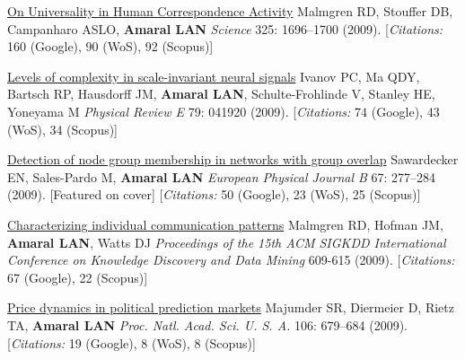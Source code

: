 \NumberedItem{\makebox[0.8cm][r]{[85]}}
\href{/people/amaral/universality-human-correspondence-activity}
{On Universality in Human Correspondence Activity}
\newline
Malmgren RD, Stouffer DB, Campanharo ASLO, {\textbf{Amaral LAN}}
\newline
\textit{Science}
    325:
1696--1700 (2009).
    [{\em{Citations:}} 160 (Google), 90 (WoS), 92 (Scopus)]
\newline
\Gap
~
\Gap

\NumberedItem{\makebox[0.8cm][r]{[84]}}
\href{/people/amaral/levels-of-complexity-in-scale-invariant-neural-signals}
{Levels of complexity in scale-invariant neural signals}
\newline
Ivanov PC, Ma QDY, Bartsch RP, Hausdorff JM, {\textbf{Amaral LAN}}, Schulte-Frohlinde V, Stanley HE, Yoneyama M
\newline
\textit{Physical Review E}
    79:
041920 (2009).
    [{\em{Citations:}} 74 (Google), 43 (WoS), 34 (Scopus)]
\newline
\Gap
~
\Gap

\NumberedItem{\makebox[0.8cm][r]{[83]}}
\href{/people/amaral/detection-of-node-group-membership-in-networks-with-group-overlap}
{Detection of node group membership in networks with group overlap}
\newline
Sawardecker EN, Sales-Pardo M, {\textbf{Amaral LAN}}
\newline
\textit{European Physical Journal B}
    67:
277--284 (2009).
    [Featured on cover]
    [{\em{Citations:}} 50 (Google), 23 (WoS), 25 (Scopus)]
\newline
\Gap
~
\Gap

\NumberedItem{\makebox[0.8cm][r]{[82]}}
\href{/people/amaral/characterizing-individual-communication-patterns}
{Characterizing individual communication patterns}
\newline
Malmgren RD, Hofman JM, {\textbf{Amaral LAN}}, Watts DJ
\newline
\textit{Proceedings of the 15th ACM SIGKDD International Conference on Knowledge Discovery and Data Mining}
609-615 (2009).
    [{\em{Citations:}} 67 (Google), 22 (Scopus)]
\newline
\Gap
~
\Gap

\NumberedItem{\makebox[0.8cm][r]{[81]}}
\href{/people/amaral/price-dynamics-in-political-prediction-markets}
{Price dynamics in political prediction markets}
\newline
Majumder SR, Diermeier D, Rietz TA, {\textbf{Amaral LAN}}
\newline
\textit{Proc. Natl. Acad. Sci. U. S. A.}
    106:
679--684 (2009).
    [{\em{Citations:}} 19 (Google), 8 (WoS), 8 (Scopus)]
\newline
\Gap
~
\Gap

